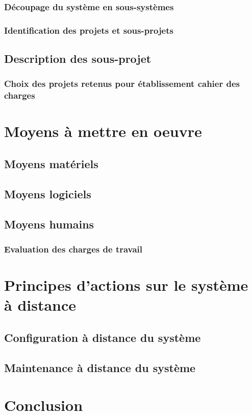 \subsubsection{Découpage du système en sous-systèmes}
\subsubsection{Identification des projets et sous-projets}
\subsection{Description des sous-projet}
\subsubsection{Choix des projets retenus pour établissement cahier des charges}

\section{Moyens à mettre en oeuvre}
\subsection{Moyens matériels}
\subsection{Moyens logiciels}
\subsection{Moyens humains}
\subsubsection{Evaluation des charges de travail}

\section{Principes d'actions sur le système à distance}
\subsection{Configuration à distance du système}
\subsection{Maintenance à distance du système}
\section{Conclusion}






